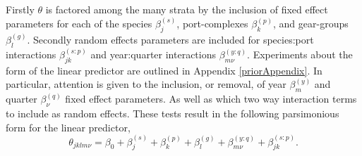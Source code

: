 \documentclass[12pt]{article}
\begin{document}
%
Firstly $\theta$ is factored among the many strata by the inclusion of 
fixed effect parameters for each of the species $\beta^{(s)}_j$, 
port-complexes $\beta^{(p)}_k$, and gear-groups $\beta^{(g)}_l$. Secondly 
random effects parameters are included for species:port interactions 
$\beta^{(s:p)}_{jk}$ and year:quarter interactions $\beta^{(y:q)}_{m\nu}$.
Experiments about the form of the linear predictor are outlined in Appendix 
\ref{priorAppendix}. In particular, attention is given to the inclusion, or 
removal, of year $\beta^{(y)}_m$ and quarter $\beta^{(q)}_\nu$ fixed effect 
parameters. As well as which two way interaction terms to include as random 
effects. These tests result in the following parsimonious form for the linear 
predictor,
%
\begin{equation}
\theta_{jklm\nu} = \beta_0 + \beta^{(s)}_j + \beta^{(p)}_k + \beta^{(g)}_l + \beta^{(y:q)}_{m\nu} + \beta^{(s:p)}_{jk}.
\end{equation}


%
%
%
\end{document}
